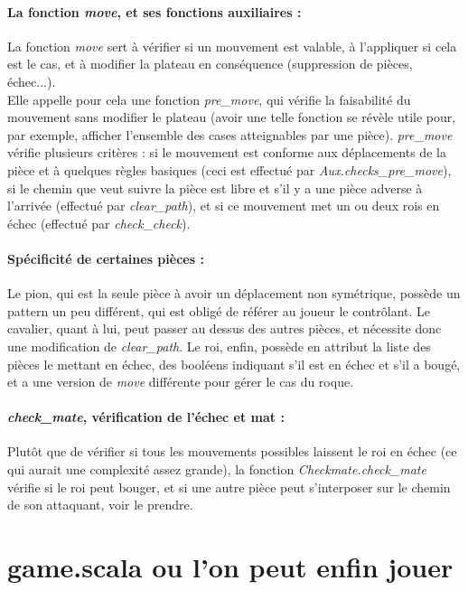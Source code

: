 \documentclass[a4paper]{article}
\begin{document}
\paragraph{La fonction \textit{move}, et ses fonctions auxiliaires :} La fonction \textit{move} sert à vérifier si un mouvement est valable, à l'appliquer si cela est le cas, et à modifier la plateau en conséquence (suppression de pièces, échec...). \\

Elle appelle pour cela une fonction \textit{pre\_move}, qui vérifie la faisabilité du mouvement sans modifier le plateau (avoir une telle fonction se révèle utile pour, par exemple, afficher l'ensemble des cases atteignables par une pièce).
\textit{pre\_move} vérifie plusieurs critères : si le mouvement est conforme aux déplacements de la pièce et à quelques règles basiques (ceci est effectué par \textit{Aux.checks\_pre\_move}), si le chemin que veut suivre la pièce est libre et s'il y a une pièce adverse à l'arrivée (effectué par \textit{clear\_path}), et si ce mouvement met un ou deux rois en échec (effectué par \textit{check\_check}).

\paragraph{Spécificité de certaines pièces :} Le pion, qui est la seule pièce à avoir un déplacement non symétrique, possède un pattern un peu différent, qui est obligé de référer au joueur le contrôlant.
Le cavalier, quant à lui, peut passer au dessus des autres pièces, et nécessite donc une modification de \textit{clear\_path}.
Le roi, enfin, possède en attribut la liste des pièces le mettant en échec, des booléens indiquant s'il est en échec et s'il a bougé, et a une version de \textit{move} différente pour gérer le cas du roque. 

\paragraph{\textit{check\_mate}, vérification de l'échec et mat :} Plutôt que de vérifier si tous les mouvements possibles laissent le roi en échec (ce qui aurait une complexité assez grande), la fonction \textit{Checkmate.check\_mate} vérifie si le roi peut bouger, et si une autre pièce peut s'interposer sur le chemin de son attaquant, voir le prendre.

\section{game.scala ou l'on peut enfin jouer}
\end{document}
